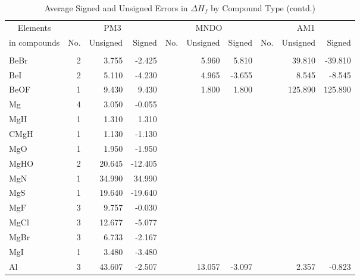 \begin{table}
\caption{\label{avehofc}Average Signed and Unsigned Errors in $\Delta H_f$ by
 Compound Type (contd.)}
\compresstable
\begin{center}
\begin{tabular}{lrrrrrrrrr}
\multicolumn{1}{c}{Elements} & \multicolumn{3}{c}{PM3} & \multicolumn{3}{c}{MNDO} &
\multicolumn{3}{c}{AM1} \\
\multicolumn{1}{c}{in compounds} &  No. & Unsigned & Signed & No. & Unsigned & Signed & No. & Unsigned & Signed \\
\hline\\
      BeBr    &      2 &    3.755 &   -2.425 &  &    5.960 &    5.810 &  &   39.810 &  -39.810 \\
      BeI     &      2 &    5.110 &   -4.230 &  &    4.965 &   -3.655 &  &    8.545 &   -8.545 \\
      BeOF    &      1 &    9.430 &    9.430 &  &    1.800 &    1.800 &  &  125.890 &  125.890 \\
  Mg        &   4 &    3.050 &   -0.055 &     &          &          &     &          &          \\
  MgH       &   1 &    1.310 &    1.310 &     &          &          &     &          &          \\
  CMgH      &   1 &    1.130 &   -1.130 &     &          &          &     &          &          \\
  MgO       &   1 &    1.950 &   -1.950 &     &          &          &     &          &          \\
  MgHO      &   2 &   20.645 &  -12.405 &     &          &          &     &          &          \\
  MgN       &   1 &   34.990 &   34.990 &     &          &          &     &          &          \\
  MgS       &   1 &   19.640 &  -19.640 &     &          &          &     &          &          \\
  MgF       &   3 &    9.757 &   -0.030 &     &          &          &     &          &          \\
  MgCl      &   3 &   12.677 &   -5.077 &     &          &          &     &          &          \\
  MgBr      &   3 &    6.733 &   -2.167 &     &          &          &     &          &          \\
  MgI       &   1 &    3.480 &   -3.480 &     &          &          &     &          &          \\
      Al      &      3 &   43.607 &   -2.507 &  &   13.057 &   -3.097 &  &    2.357 &   -0.823 \\

\end{tabular}
\end{center}
\end{table}
